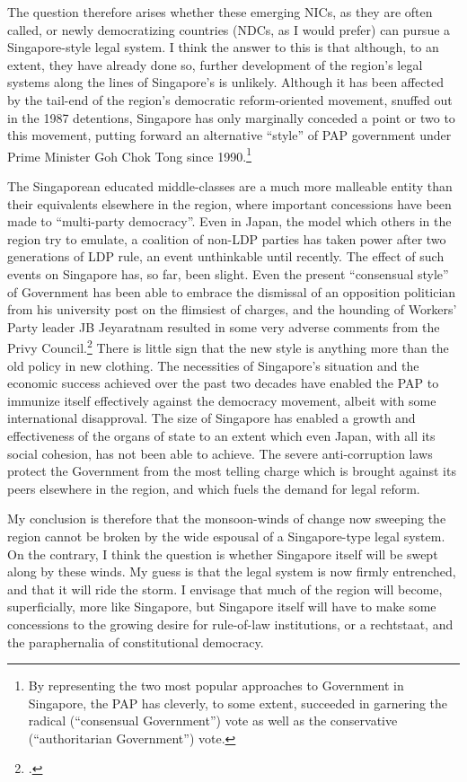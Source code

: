 The question therefore arises whether these emerging NICs, as
they are often called, or newly democratizing countries (NDCs, as
I would prefer) can pursue a Singapore-style legal system. I
think the answer to this is that although, to an extent, they
have already done so, further development of the region's legal
systems along the lines of Singapore's is unlikely. Although it
has been affected by the tail-end of the region's democratic
reform-oriented movement, snuffed out in the 1987 detentions,
Singapore has only marginally conceded a point or two to this
movement, putting forward an alternative ``style'' of PAP
government under Prime Minister Goh Chok Tong since
1990.\footnote{ By representing the two most popular approaches
  to Government in Singapore, the PAP has cleverly, to some
  extent, succeeded in garnering the radical (``consensual
  Government'') vote as well as the conservative (``authoritarian
  Government'') vote.}


The Singaporean educated middle-classes are a much more malleable
entity than their equivalents elsewhere in the region, where
important concessions have been made to ``multi-party
democracy''. Even in Japan, the model which others in the region
try to emulate, a coalition of non-LDP parties has taken power
after two generations of LDP rule, an event unthinkable until
recently.  The effect of such events on Singapore has, so far,
been slight.  Even the present ``consensual style'' of Government
has been able to embrace the dismissal of an opposition
politician from his university post on the flimsiest of charges,
and the hounding of Workers' Party leader JB Jeyaratnam resulted
in some very adverse comments from the Privy Council.\footnote{
  .} There is little sign
that the new style is anything more than the old policy in new
clothing. The necessities of Singapore's situation and the
economic success achieved over the past two decades have enabled
the PAP to immunize itself effectively against the democracy
movement, albeit with some international disapproval.  The size
of Singapore has enabled a growth and effectiveness of the organs
of state to an extent which even Japan, with all its social
cohesion, has not been able to achieve. The severe
anti-corruption laws protect the Government from the most telling
charge which is brought against its peers elsewhere in the
region, and which fuels the demand for legal reform.

My conclusion is therefore that the monsoon-winds of change now
sweeping the region cannot be broken by the wide espousal of a
Singapore-type legal system. On the contrary, I think the
question is whether Singapore itself will be swept along by these
winds. My guess is that the legal system is now firmly
entrenched, and that it will ride the storm. I envisage that much
of the region will become, superficially, more like Singapore,
but Singapore itself will have to make some concessions to the
growing desire for rule-of-law institutions, or a rechtstaat,
and the paraphernalia of constitutional democracy. 










